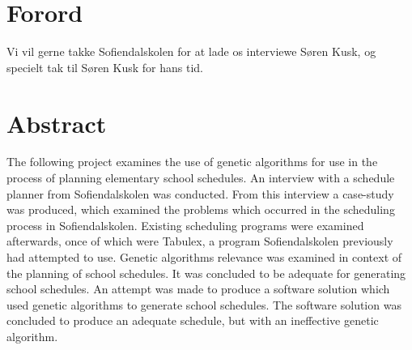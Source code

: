 

\clearpage
\setcounter{page}{1}
\section{Forord}
Vi vil gerne takke Sofiendalskolen for at lade os interviewe Søren Kusk, og specielt tak til Søren Kusk for hans tid.

\section{Abstract}
The following project examines the use of genetic algorithms for use in the process of planning elementary school schedules. An interview with a schedule planner from Sofiendalskolen was conducted. From this interview a case-study was produced, which examined the problems which occurred in the scheduling process in Sofiendalskolen. Existing scheduling programs were examined afterwards, once of which were Tabulex, a program Sofiendalskolen previously had attempted to use. Genetic algorithms relevance was examined in context of the planning of school schedules. It was concluded to be adequate for generating school schedules. An attempt was made to produce a software solution which used genetic algorithms to generate school schedules. The software solution was concluded to produce an adequate schedule, but with an ineffective genetic algorithm. 
\newpage
\tableofcontents
\newpage
